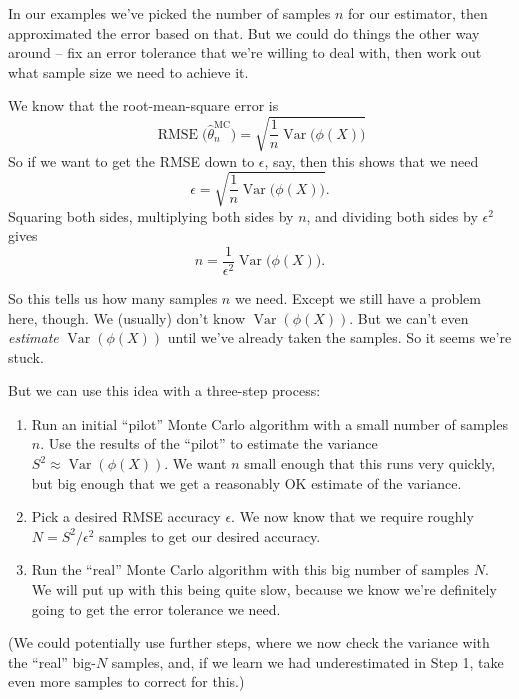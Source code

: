 \documentclass[
  letterpaper,
  DIV=11,
  numbers=noendperiod]{scrreprt}
\newcommand{\Var}{\operatorname{Var}}
\theoremstyle{plain}
\theoremstyle{definition}
\theoremstyle{definition}
\theoremstyle{remark}
\begin{document}
In our examples we've picked the number of samples \(n\) for our
estimator, then approximated the error based on that. But we could do
things the other way around -- fix an error tolerance that we're willing
to deal with, then work out what sample size we need to achieve it.

We know that the root-mean-square error is
\[ \operatorname{RMSE}\big(\widehat{\theta}_n^{\mathrm{MC}}\big) = \sqrt{\frac{1}{n} \operatorname{Var}\big(\phi(X)\big)} \]
So if we want to get the RMSE down to \(\epsilon\), say, then this shows
that we need
\[ \epsilon = \sqrt{\frac{1}{n} \operatorname{Var}\big(\phi(X)\big)} .\]
Squaring both sides, multiplying both sides by \(n\), and dividing both
sides by \(\epsilon^2\) gives
\[ n = \frac{1}{\epsilon^2} \Var\big(\phi(X)\big) . \]

So this tells us how many samples \(n\) we need. Except we still have a
problem here, though. We (usually) don't know \(\Var(\phi(X))\). But we
can't even \emph{estimate} \(\Var(\phi(X))\) until we've already taken
the samples. So it seems we're stuck.

But we can use this idea with a three-step process:

\begin{enumerate}
\def\labelenumi{\arabic{enumi}.}
\item
  Run an initial ``pilot'' Monte Carlo algorithm with a small number of
  samples \(n\). Use the results of the ``pilot'' to estimate the
  variance \(S^2 \approx \Var(\phi(X))\). We want \(n\) small enough
  that this runs very quickly, but big enough that we get a reasonably
  OK estimate of the variance.
\item
  Pick a desired RMSE accuracy \(\epsilon\). We now know that we require
  roughly \(N = S^2 / \epsilon^2\) samples to get our desired accuracy.
\item
  Run the ``real'' Monte Carlo algorithm with this big number of samples
  \(N\). We will put up with this being quite slow, because we know
  we're definitely going to get the error tolerance we need.
\end{enumerate}

(We could potentially use further steps, where we now check the variance
with the ``real'' big-\(N\) samples, and, if we learn we had
underestimated in Step 1, take even more samples to correct for this.)
\end{document}
